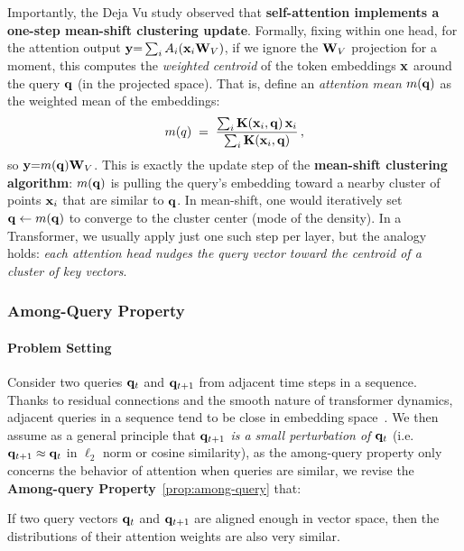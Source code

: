 Importantly, the Deja Vu study observed that \textbf{self-attention implements a one-step mean-shift clustering update}. Formally, fixing within one head, for the attention output $\mathbf{y} {=} \sum_{i} A_i (\mathbf{x}_i \mathbf{W}_V)$, if we ignore the $\mathbf{W}_V$ projection for a moment, this computes the \emph{weighted centroid} of the token embeddings $\mathbf{x}$ around the query $\mathbf{q}$ (in the projected space). That is, define an \emph{attention mean} $m(\mathbf{q})$ as the weighted mean of the embeddings:
\begin{equation}
    m(q) \;=\; \frac{\sum_i \mathbf{K}(\mathbf{x}_i, \mathbf{q})\, \mathbf{x}_i}{\sum_i \mathbf{K}(\mathbf{x}_i, \mathbf{q})}\,,
\end{equation}
so $\mathbf{y} {=} m(\mathbf{q}) \mathbf{W}_V$.  This is exactly the update step of the \textbf{mean-shift clustering algorithm}: $m(\mathbf{q})$ is pulling the query’s embedding toward a nearby cluster of points ${\mathbf{x}_i}$ that are similar to $\mathbf{q}$. In mean-shift, one would iteratively set $\mathbf{q} \leftarrow m(\mathbf{q})$ to converge to the cluster center (mode of the density). In a Transformer, we usually apply just one such step per layer, but the analogy holds: \emph{each attention head nudges the query vector toward the centroid of a cluster of key vectors}.


\subsubsection{Among-Query Property}


\paragraph{Problem Setting} Consider two queries $\mathbf{q}_t$ and $\mathbf{q}_{t+1}$ from adjacent time steps in a sequence. Thanks to residual connections and the smooth nature of transformer dynamics, adjacent queries in a sequence tend to be close in embedding space~\cite{sun2024shadowkv,wuhshare}. We then assume as a general principle that \emph{$\mathbf{q}_{t+1}$ is a small perturbation of $\mathbf{q}_t$} (i.e. $\mathbf{q}_{t+1} \approx \mathbf{q}_t$ in $\ell_2$ norm or cosine similarity), as the among-query property only concerns the behavior of attention when queries are similar, we revise the \textbf{Among-query Property}~\ref{prop:among-query} that:

\begin{property}
\label{prop:among-query_new}
If two query vectors $\mathbf{q}_t$ and $\mathbf{q}_{t+1}$ are aligned enough in vector space, then the distributions of their attention weights are also very similar.
\end{property}

